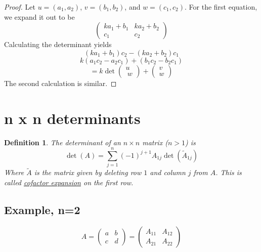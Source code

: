 \documentclass{article}
\newtheorem{definition}[theorem]{Definition}
\newtheorem{one minute paper}[theorem]{One Minute Paper}
\begin{document}
\begin{proof}
    Let $u = (a_1,a_2)$, $v = (b_1,b_2)$, and $w=(c_1,c_2)$. For the first equation, we expand it out to be 
    \begin{equation}
        \begin{pmatrix}
            ka_1 + b_1 & ka_2 + b_2 \\
            c_1 & c_2
        \end{pmatrix}
    \end{equation}
    Calculating the determinant yields
    \begin{equation}
        (ka_1 + b_1)c_2 - (ka_2 + b_2)c_1
    \end{equation}
    \begin{equation}
        k(a_1c_2 - a_2c_1) + (b_1c_2 - b_2c_1)
    \end{equation}
    \begin{equation}
        = k\det\begin{pmatrix}
            u \\\
            w
        \end{pmatrix} + \begin{pmatrix}
            v \\
            w
        \end{pmatrix}
    \end{equation}
    The second calculation is similar. 
\end{proof}

\section*{n x n determinants}

\begin{definition}
    The determinant of an $n \times n$ matrix ($n > 1$) is 
    \begin{equation}
        \det(A) = \sum_{j=1}^{n}(-1)^{j+1}A_{1j}\det(\tilde{A}_{1j})
    \end{equation}
    Where $\tilde{A}$ is the matrix given by deleting row $1$ and column $j$ from $A$. This is called \underline{cofactor expansion} on the first row. 
\end{definition}

\subsection*{Example, n=2}

\begin{equation}
    A = \begin{pmatrix}
        a & b \\
        c & d
    \end{pmatrix} = \begin{pmatrix}
        A_{11} & A_{12} \\
        A_{21} & A_{22}
    \end{pmatrix}
\end{equation}
\end{document}
